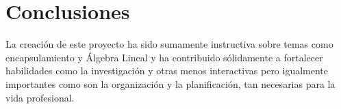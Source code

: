 \documentclass[a4paper, 12pt]{article}
\begin{document}
\newpage

\section{Conclusiones}\label{sec:concl}
La creación de este proyecto ha sido sumamente instructiva sobre temas como encapsulamiento y Álgebra Lineal y ha contribuido sólidamente a fortalecer habilidades como la investigación y otras menos interactivas pero igualmente importantes como son la organización y la planificación, tan necesarias para la vida profesional.
\end{document}
